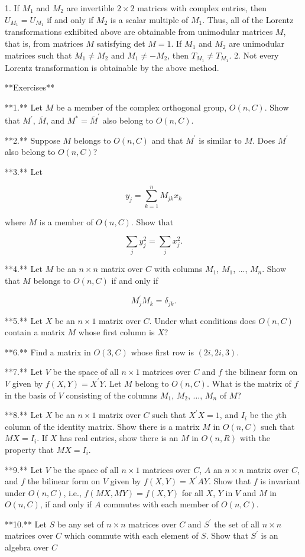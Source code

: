 1. If \(M_{1}\) and \(M_{2}\) are invertible \(2\times 2\) matrices with complex entries, then \(U_{M_{1}}=U_{M_{1}}\) if and only if \(M_{2}\) is a scalar multiple of \(M_{1}\). Thus, all of the Lorentz transformations exhibited above are obtainable from unimodular matrices \(M\), that is, from matrices \(M\) satisfying det \(M=1\). If \(M_{1}\) and \(M_{2}\) are unimodular matrices such that \(M_{1}\neq M_{2}\) and \(M_{1}\neq-M_{2}\), then \(T_{M_{1}}\neq T_{M_{1}}\).
2. Not every Lorentz transformation is obtainable by the above method.

**Exercises**

**1.** Let \(M\) be a member of the complex orthogonal group, \(O(n,C)\). Show that \(M^{\prime}\), \(\overline{M}\), and \(M^{*}=\overline{M}^{\prime}\) also belong to \(O(n,C)\).

**2.** Suppose \(M\) belongs to \(O(n,C)\) and that \(M^{\prime}\) is similar to \(M\). Does \(M^{\prime}\) also belong to \(O(n,C)\)?

**3.** Let

\[y_{j}=\sum_{k=1}^{n}M_{jk}x_{k}\]

where \(M\) is a member of \(O(n,C)\). Show that

\[\sum_{j}y_{j}^{2}=\sum_{j}x_{j}^{2}.\]

**4.** Let \(M\) be an \(n\times n\) matrix over \(C\) with columns \(M_{1}\), \(M_{1}\), ..., \(M_{n}\). Show that \(M\) belongs to \(O(n,C)\) if and only if

\[M^{\prime}_{j}M_{k}=\delta_{jk}.\]

**5.** Let \(X\) be an \(n\times 1\) matrix over \(C\). Under what conditions does \(O(n,C)\) contain a matrix \(M\) whose first column is \(X\)?

**6.** Find a matrix in \(O(3,C)\) whose first row is \((2i,2i,3)\).

**7.** Let \(V\) be the space of all \(n\times 1\) matrices over \(C\) and \(f\) the bilinear form on \(V\) given by \(f(X,Y)=X^{\prime}Y\). Let \(M\) belong to \(O(n,C)\). What is the matrix of \(f\) in the basis of \(V\) consisting of the columns \(M_{1}\), \(M_{2}\), ..., \(M_{n}\) of \(M\)?

**8.** Let \(X\) be an \(n\times 1\) matrix over \(C\) such that \(X^{\prime}X=1\), and \(I_{i}\) be the \(j\)th column of the identity matrix. Show there is a matrix \(M\) in \(O(n,C)\) such that \(MX=I_{i}\). If \(X\) has real entries, show there is an \(M\) in \(O(n,R)\) with the property that \(MX=I_{i}\).

**9.** Let \(V\) be the space of all \(n\times 1\) matrices over \(C\), \(A\) an \(n\times n\) matrix over \(C\), and \(f\) the bilinear form on \(V\) given by \(f(X,Y)=X^{\prime}AY\). Show that \(f\) is invariant under \(O(n,C)\), i.e., \(f(MX,MY)=f(X,Y)\) for all \(X\), \(Y\) in \(V\) and \(M\) in \(O(n,C)\), if and only if \(A\) commutes with each member of \(O(n,C)\).

**10.** Let \(S\) be any set of \(n\times n\) matrices over \(C\) and \(S^{\prime}\) the set of all \(n\times n\) matrices over \(C\) which commute with each element of \(S\). Show that \(S^{\prime}\) is an algebra over \(C\) 